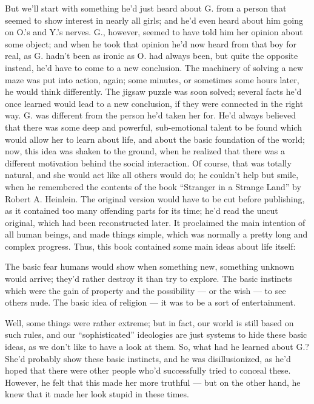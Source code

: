 But we'll start with something he'd just heard about G. from a person that seemed to show interest in nearly all girls; and he'd even heard about him going on O.'s and Y.'s nerves. G., however, seemed to have told him her opinion about some object; and when he took that opinion he'd now heard from that boy for real, as G. hadn't been as ironic as O. had always been, but quite the opposite instead, he'd have to come to a new conclusion. The machinery of solving a new maze was put into action, again; some minutes, or sometimes some hours later, he would think differently. The jigsaw puzzle was soon solved; several facts he'd once learned would lead to a new conclusion, if they were connected in the right way. G. was different from the person he'd taken her for. He'd always believed that there was some deep and powerful, sub-emotional talent to be found which would allow her to learn about life, and about the basic foundation of the world; now, this idea was shaken to the ground, when he realized that there was a different motivation behind the social interaction. Of course, that was totally natural, and she would act like all others would do; he couldn't help but smile, when he remembered the contents of the book \enquote{Stranger in a Strange Land} by Robert A. Heinlein. The original version would have to be cut before publishing, as it contained too many offending parts for its time; he'd read the uncut original, which had been reconstructed later. It proclaimed the main intention of all human beings, and made things simple, which was normally a pretty long and complex progress. Thus, this book contained some main ideas about life itself:

The basic fear humans would show when something new, something unknown would arrive; they'd rather destroy it than try to explore. 
The basic instincts which were the gain of property and the possibility --- or the wish --- to see others nude. 
The basic idea of religion --- it was to be a sort of entertainment.

Well, some things were rather extreme; but in fact, our world is still based on such rules, and our \enquote{sophisticated} ideologies are just systems to hide these basic ideas, as we don't like to have a look at them. So, what had he learned about G.? She'd probably show these basic instincts, and he was disillusionized, as he'd hoped that there were other people who'd successfully tried to conceal these. However, he felt that this made her more truthful --- but on the other hand, he knew that it made her look stupid in these times.

